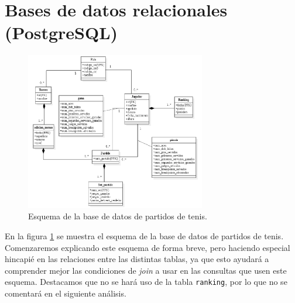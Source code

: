 \section{Bases de datos relacionales (PostgreSQL)}

\begin{figure}[H]
  \centering
  \includegraphics[width=0.7\textwidth]{fotos/esquema.png}
  \caption{Esquema de la base de datos de partidos de tenis.}
  \label{fig:schbd}
\end{figure}

En la figura \ref{fig:schbd} se muestra el esquema de la base de datos de partidos de tenis. Comenzaremos explicando este esquema de forma breve, pero haciendo especial hincapié en las relaciones entre las distintas tablas, ya que esto ayudará a comprender mejor las condiciones de \textit{join} a usar en las consultas que usen este esquema. Destacamos que no se hará uso de la tabla \texttt{ranking}, por lo que no se comentará en el siguiente análisis. \\

